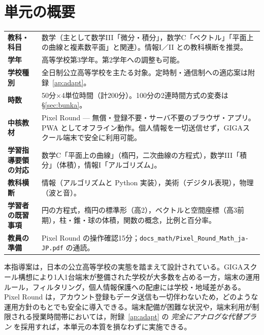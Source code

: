 \documentclass[12pt,a4paper]{scrartcl}
\begin{document}
\renewcommand{\contentsname}{\color{accent}目\quad 次}
\tableofcontents
\thispagestyle{fancy}
\newpage

\section{単元の概要}

\begin{center}
\begin{tabular}{@{}p{}p{}@{}}
\toprule
\textbf{教科・科目} & 数学（主として数学III「微分・積分」，数学C「ベクトル」「平面上の曲線と複素数平面」と関連）。情報I／II との教科横断を推奨。 \\
\addlinespace[2pt]
\textbf{学年} & 高等学校第3学年。第2学年への調整も可能。 \\
\addlinespace[2pt]
\textbf{学校種別} & 全日制公立高等学校を主たる対象。定時制・通信制への適応案は附録~\ref{ap:adapt}。 \\
\addlinespace[2pt]
\textbf{時数} & 50分×4単位時間（計200分）。100分の2連時間方式の変奏は §\ref{sec:bunka}。 \\
\addlinespace[2pt]
\textbf{中核教材} & Pixel Round --- 無償・登録不要・サーバ不要のブラウザ・アプリ。 PWA としてオフライン動作。個人情報を一切送信せず，GIGAスクール端末で安全に利用可能。 \\
\addlinespace[2pt]
\textbf{学習指導要領の対応} & 数学C「平面上の曲線」（楕円，二次曲線の方程式），数学III「積分」（体積），情報I「アルゴリズム」。 \\
\addlinespace[2pt]
\textbf{教科横断} & 情報（アルゴリズムと Python 実装），美術（デジタル表現），物理（波と音）。 \\
\addlinespace[2pt]
\textbf{学習者の既習事項} & 円の方程式，楕円の標準形（高2），ベクトルと空間座標（高3前期），柱・錐・球の体積，関数の概念，比例と百分率。 \\
\addlinespace[2pt]
\textbf{教員の準備} & Pixel Round の操作確認15分；\texttt{docs\_math/Pixel\_Round\_Math\_ja-JP.pdf} の通読。 \\
\bottomrule
\end{tabular}
\end{center}

\begin{ryuui}[実施環境について]
本指導案は，日本の公立高等学校の実態を踏まえて設計されている。GIGAスクール構想により1人1台端末が整備された学校が大多数を占める一方，端末の運用ルール，フィルタリング，個人情報保護への配慮には学校・地域差がある。Pixel Round は，アカウント登録もデータ送信も一切伴わないため，どのような運用方針のもとでも安全に導入できる。端末配備が困難な状況や，端末利用が制限される授業時間帯においては，附録~\ref{ap:adapt} の \emph{完全にアナログな代替プラン} を採用すれば，本単元の本質を損なわずに実施できる。
\end{ryuui}
\end{document}
